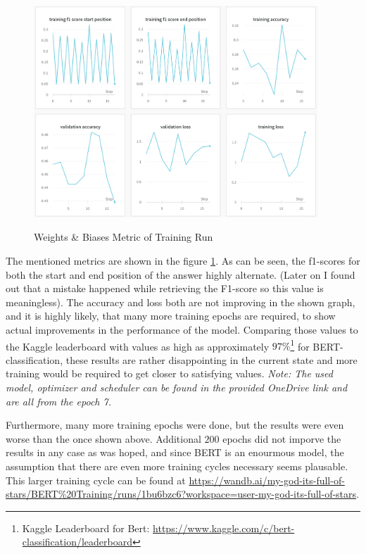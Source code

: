         \begin{figure}[h!]
            \centering
            \caption{Weights \& Biases Metric of Training Run \cite{wandbScreenshot}}
            \includegraphics[width=0.95\textwidth]{figures/wandb_metrics.png}
            \label{fig:-wandb-metric}
        \end{figure}
        The mentioned metrics are shown in the figure \ref{fig:-wandb-metric}.
        As can be seen, the f1-scores for both the start and end position of the answer highly alternate. (Later on I found out that a mistake happened while retrieving the F1-score so this value is meaningless). The accuracy and loss both are not improving in the shown graph, and it is highly likely, that many more training epochs are required, to show actual improvements in the performance of the model.
        Comparing those values to the Kaggle leaderboard with values as high as approximately $97\%$\footnote{Kaggle Leaderboard for Bert: \url{https://www.kaggle.com/c/bert-classification/leaderboard}} for BERT-classification, these results are rather disappointing in the current state and more training would be required to get closer to satisfying values.
        \emph{Note: The used model, optimizer and scheduler can be found in the provided OneDrive link and are all from the epoch 7.}

        Furthermore, many more training epochs were done, but the results were even worse than the once shown above.
        Additional $200$ epochs did not imporve the results in any case as was hoped, and since BERT is an enourmous model, the assumption that there are even more training cycles necessary seems plausable.
        This larger training cycle can be found at \url{https://wandb.ai/my-god-its-full-of-stars/BERT%20Training/runs/1bu6bzc6?workspace=user-my-god-its-full-of-stars}.

